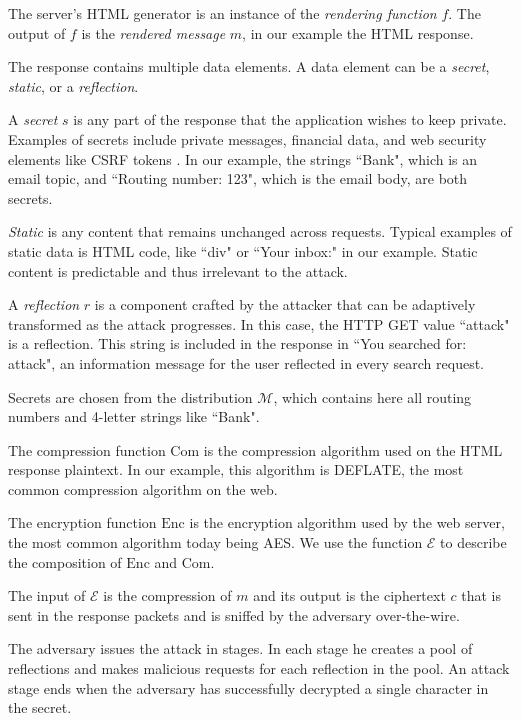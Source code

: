 The server's HTML generator is an instance of the \textit{rendering function}
$f$. The output of $f$ is the \textit{rendered message} $m$, in our example the
HTML response.

The response contains multiple data elements. A data element can be a
\textit{secret}, \textit{static}, or a \textit{reflection}.

A \textit{secret} $s$ is any part of the response that the application wishes to
keep private. Examples of secrets include private messages, financial data, and
web security elements like CSRF tokens \cite{de2011automatic}. In our example,
the strings ``Bank", which is an email topic, and ``Routing number: 123", which
is the email body, are both secrets.

\textit{Static} is any content that remains unchanged across requests. Typical
examples of static data is HTML code, like ``div" or ``Your inbox:" in our
example. Static content is predictable and thus irrelevant to the attack.

A \textit{reflection} $r$ is a component crafted by the attacker that can be
adaptively transformed as the attack progresses. In this case, the HTTP GET
value ``attack" is a reflection. This string is included in the response in ``You
searched for: attack", an information message for the user reflected in every
search request.

Secrets are chosen from the distribution $\mathcal{M}$, which contains here all
routing numbers and 4-letter strings like ``Bank".

The compression function $\textrm{Com}$ is the compression algorithm used on the
HTML response plaintext. In our example, this algorithm is DEFLATE, the most
common compression algorithm on the web.

The encryption function $\textrm{Enc}$ is the encryption algorithm used by the
web server, the most common algorithm today being AES.  We use the function
$\mathcal{E}$ to describe the composition of $\textrm{Enc}$ and $\textrm{Com}$.

The input of $\mathcal{E}$ is the compression of $m$ and its output is the
ciphertext $c$ that is sent in the response packets and is sniffed by the
adversary over-the-wire.

The adversary issues the attack in stages. In each stage he creates a pool of
reflections and makes malicious requests for each reflection in the pool. An
attack stage ends when the adversary has successfully decrypted a single
character in the secret.
